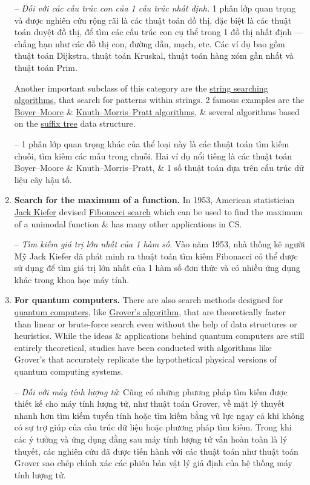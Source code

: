 \documentclass{article}
\begin{document}
\begin{enumerate}
	-- {\it Đối với các cấu trúc con của 1 cấu trúc nhất định.} 1 phân lớp quan trọng và được nghiên cứu rộng rãi là các thuật toán đồ thị, đặc biệt là các thuật toán duyệt đồ thị, để tìm các cấu trúc con cụ thể trong 1 đồ thị nhất định — chẳng hạn như các đồ thị con, đường dẫn, mạch, etc. Các ví dụ bao gồm thuật toán Dijkstra, thuật toán Kruskal, thuật toán hàng xóm gần nhất và thuật toán Prim.
	
	Another important subclass of this category are the \href{https://en.wikipedia.org/wiki/String_searching_algorithm}{string searching algorithms}, that search for patterns within strings. 2 famous examples are the \href{https://en.wikipedia.org/wiki/Boyer%E2%80%93Moore_string-search_algorithm}{Boyer--Moore} \& \href{https://en.wikipedia.org/wiki/Knuth%E2%80%93Morris%E2%80%93Pratt_algorithm}{Knuth--Morris--Pratt algorithms}, \& several algorithms based on the \href{https://en.wikipedia.org/wiki/Suffix_tree}{suffix tree} data structure.
	
	-- 1 phân lớp quan trọng khác của thể loại này là các thuật toán tìm kiếm chuỗi, tìm kiếm các mẫu trong chuỗi. Hai ví dụ nổi tiếng là các thuật toán Boyer--Moore \& Knuth--Morris--Pratt, \& 1 số thuật toán dựa trên cấu trúc dữ liệu cây hậu tố.
	\item {\bf Search for the maximum of a function.} In 1953, American statistician \href{https://en.wikipedia.org/wiki/Jack_Kiefer_(statistician)}{\sc Jack Kiefer} devised \href{https://en.wikipedia.org/wiki/Fibonacci_search_technique}{Fibonacci search} which can be used to find the maximum of a unimodal function \& has many other applications in CS.
	
	-- {\it Tìm kiếm giá trị lớn nhất của 1 hàm số.} Vào năm 1953, nhà thống kê người Mỹ Jack Kiefer đã phát minh ra thuật toán tìm kiếm Fibonacci có thể được sử dụng để tìm giá trị lớn nhất của 1 hàm số đơn thức và có nhiều ứng dụng khác trong khoa học máy tính.
	\item {\bf For quantum computers.} There are also search methods designed for \href{https://en.wikipedia.org/wiki/Quantum_computing}{quantum computers}, like \href{https://en.wikipedia.org/wiki/Grover%27s_algorithm}{Grover's algorithm}, that are theoretically faster than linear or brute-force search even without the help of data structures or heuristics. While the ideas \& applications behind quantum computers are still entirely theoretical, studies have been conducted with algorithms like Grover's that accurately replicate the hypothetical physical versions of quantum computing systems.
	
	-- {\it Đối với máy tính lượng tử}: Cũng có những phương pháp tìm kiếm được thiết kế cho máy tính lượng tử, như thuật toán Grover, về mặt lý thuyết nhanh hơn tìm kiếm tuyến tính hoặc tìm kiếm bằng vũ lực ngay cả khi không có sự trợ giúp của cấu trúc dữ liệu hoặc phương pháp tìm kiếm. Trong khi các ý tưởng và ứng dụng đằng sau máy tính lượng tử vẫn hoàn toàn là lý thuyết, các nghiên cứu đã được tiến hành với các thuật toán như thuật toán Grover sao chép chính xác các phiên bản vật lý giả định của hệ thống máy tính lượng tử.
\end{enumerate}
\end{document}
